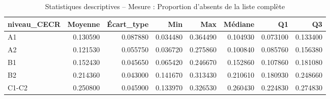 \begin{table}
\caption{Statistiques descriptives – Mesure : Proportion d'absents de la liste complète}
\label{tab:stats_PA_SUBTLEX_MAX}
\begin{tabular}{lrrrrrrr}
\toprule
niveau_CECR & Moyenne & Écart_type & Min & Max & Médiane & Q1 & Q3 \\
\midrule
A1 & 0.130590 & 0.087880 & 0.034480 & 0.364490 & 0.104930 & 0.073100 & 0.133400 \\
A2 & 0.121530 & 0.055750 & 0.036720 & 0.275860 & 0.100840 & 0.085760 & 0.156380 \\
B1 & 0.152430 & 0.045650 & 0.065420 & 0.246670 & 0.152860 & 0.107860 & 0.181080 \\
B2 & 0.214360 & 0.043000 & 0.141670 & 0.313430 & 0.210610 & 0.180930 & 0.248660 \\
C1-C2 & 0.250800 & 0.045900 & 0.133970 & 0.326530 & 0.260430 & 0.224830 & 0.274830 \\
\bottomrule
\end{tabular}
\end{table}
